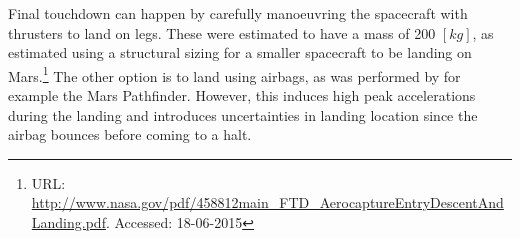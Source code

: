 Final touchdown can happen by carefully manoeuvring the spacecraft with thrusters to land on legs. These were estimated to have a mass of 200 $[kg]$, as estimated using a structural sizing for a smaller spacecraft to be landing on Mars.\footnote{URL: \url{http://www.nasa.gov/pdf/458812main_FTD_AerocaptureEntryDescentAndLanding.pdf}. Accessed: 18-06-2015} The other option is to land using airbags, as was performed by for example the Mars Pathfinder. However, this induces high peak accelerations during the landing and introduces uncertainties in landing location since the airbag bounces before coming to a halt.
